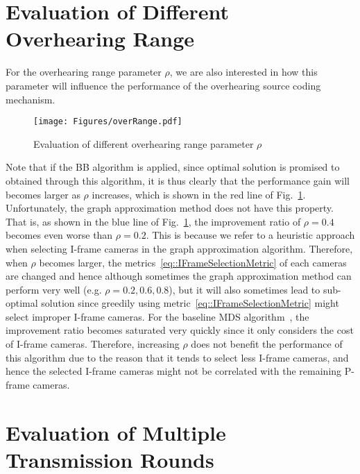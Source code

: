 \section{Evaluation of Different Overhearing Range}
For the overhearing range parameter $\rho$, we are also interested in how this parameter will influence the performance of the overhearing source coding mechanism.
%
\begin{figure}
\begin{center}
\texttt{[image: Figures/overRange.pdf]}
\caption{\label{fig::evaOverRange}Evaluation of different overhearing range parameter $\rho$}
\end{center}
\end{figure}
%
Note that if the BB algorithm is applied, since optimal solution is promised to obtained through this algorithm, it is thus clearly that the performance gain will becomes larger as $\rho$ increases, which is shown in the red line of Fig.~\ref{fig::evaOverRange}.
Unfortunately, the graph approximation method does not have this property.
That is, as shown in the blue line of Fig.~\ref{fig::evaOverRange}, the improvement ratio of $\rho = 0.4$ becomes even worse than $\rho = 0.2$.
This is because we refer to a heuristic approach when selecting I-frame cameras in the graph approximation algorithm.
Therefore, when $\rho$ becomes larger, the metrics~\eqref{eq::IFrameSelectionMetric} of each cameras are changed and hence although sometimes the graph approximation method can perform very well (e.g. $\rho = 0.2,0.6,0.8$), but it will also sometimes lead to sub-optimal solution since greedily using metric~\eqref{eq::IFrameSelectionMetric} might select improper I-frame cameras.
For the baseline MDS algorithm~\cite{MWDS_baseline}, the improvement ratio becomes saturated very quickly since it only considers the cost of I-frame cameras.
Therefore, increasing $\rho$ does not benefit the performance of this algorithm due to the reason that it tends to select less I-frame cameras, and hence the selected I-frame cameras might not be correlated with the remaining P-frame cameras.

\section{Evaluation of Multiple Transmission Rounds}
%

